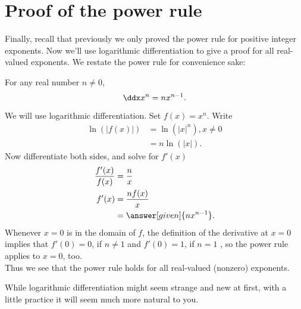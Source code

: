 \documentclass{ximera}
\begin{document}
\section{Proof of the power rule}


Finally, recall that previously we only proved the power rule for
positive integer exponents. Now we'll use logarithmic differentiation to give
a proof for all real-valued exponents. We restate the power rule
for convenience sake:

\begin{theorem}
For any  real number $n\ne0$, 
\[
\ddx x^n = n x^{n-1}.
\]
\begin{explanation}

We will use logarithmic differentiation. Set $f(x) = x^n$. Write
\begin{align*}
\ln(|f(x)|) &= \ln\left(|x|^n\right) , x\ne0\\ 
&= n\ln(|x|).
\end{align*}
Now differentiate both sides, and solve for $f'(x)$
\begin{align*}
\frac{f'(x)}{f(x)} &= \frac{n}{x}\\
f'(x) &=\frac{n f(x)}{x}\\
&= \answer[given]{n x^{n-1}}.
\end{align*}
Whenever $x=0$ is in the domain of $f$, the definition of the derivative at $x=0$ implies that  $f'(0)=0$, if $n\ne1$ and $f'(0)=1$, if $n=1$ , so the power rule applies to $x=0$, too.\\

Thus we see that the power rule holds for all real-valued (nonzero) exponents.
\end{explanation}
\end{theorem}

While logarithmic differentiation might seem strange and new at
first, with a little practice it will seem much more natural to you.
\end{document}
